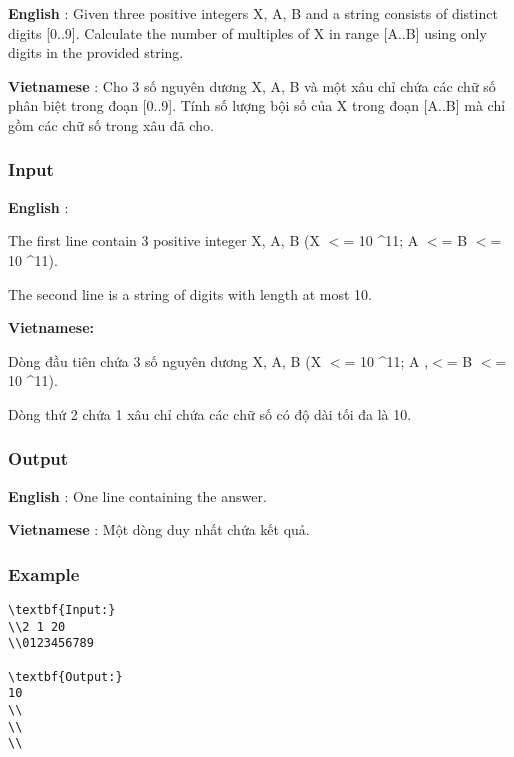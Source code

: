 



\textbf{    English   }   : Given three positive integers X, A, B and a string consists of distinct digits [0..9]. Calculate the number of multiples of X in range [A..B] using only digits in the provided string.  

\textbf{    Vietnamese   }   : Cho 3 số nguyên dương X, A, B và một xâu chỉ chứa các chữ số phân biệt trong đoạn [0..9]. Tính số lượng bội số của X trong đoạn [A..B] mà chỉ gồm các chữ số trong xâu đã cho.  

\subsubsection{   Input  }

\textbf{    English   }   :  

   The first line contain 3 positive integer X, A, B (X $<$= 10 \textasciicircum 11; A $<$= B $<$= 10 \textasciicircum 11).  

   The second line is a string of digits with length at most 10.  

\textbf{    Vietnamese:   }

   Dòng đầu tiên chứa 3 số nguyên dương X, A, B (X $<$= 10 \textasciicircum 11; A ,$<$= B $<$= 10 \textasciicircum 11).  

   Dòng thứ 2 chứa 1 xâu chỉ chứa các chữ số có độ dài tối đa là 10.  

\subsubsection{   Output  }

\textbf{    English   }   : One line containing the answer.  

\textbf{    Vietnamese   }   : Một dòng duy nhất chứa kết quả.  

\subsubsection{   Example  }
\begin{verbatim}
\textbf{Input:}
\\2 1 20
\\0123456789

\textbf{Output:}
10
\\
\\
\\\end{verbatim}